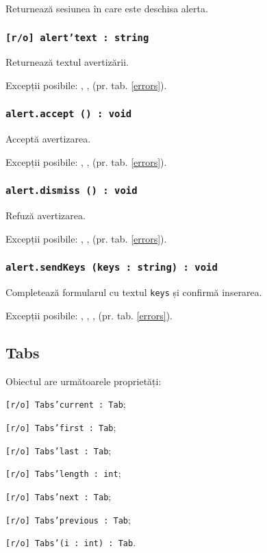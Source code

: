 Returnează sesiunea în care este deschisa alerta.

\subsubsection{\texttt{[r/o] alert'text : string}}

Returnează textul avertizării.

Excepții posibile: , ,  (pr. tab. \ref{errors}).

\subsubsection{\texttt{alert.accept () : void}}

Acceptă avertizarea.

Excepții posibile: , ,  (pr. tab. \ref{errors}).

\subsubsection{\texttt{alert.dismiss () : void}}

Refuză avertizarea.

Excepții posibile: , ,  (pr. tab. \ref{errors}).

\subsubsection{\texttt{alert.sendKeys (keys : string) : void}}

Completează formularul cu textul \texttt{keys} și confirmă inserarea.

Excepții posibile: , , ,  (pr. tab. \ref{errors}).

\subsection{{\color{orange} Tabs}}

Obiectul \tabs{} are următoarele proprietăți:
\begin{icItems}
	\item \texttt{[r/o] Tabs'current : Tab};
	\item \texttt{[r/o] Tabs'first : Tab};
	\item \texttt{[r/o] Tabs'last : Tab};
	\item \texttt{[r/o] Tabs'length : int};
	\item \texttt{[r/o] Tabs'next : Tab};
	\item \texttt{[r/o] Tabs'previous : Tab};
	\item \texttt{[r/o] Tabs'(i : int) : Tab}.
\end{icItems}

